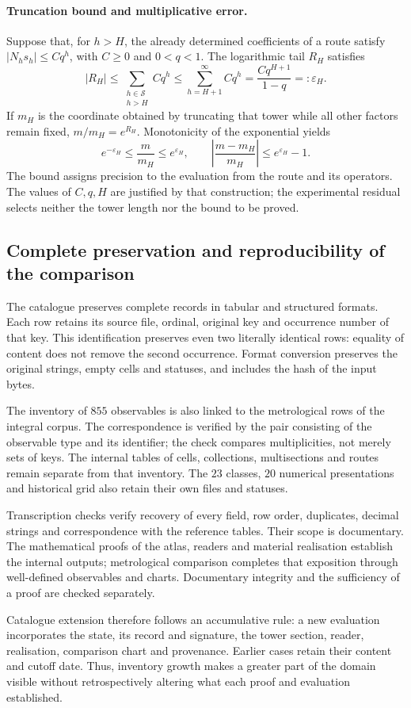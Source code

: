 \paragraph{Truncation bound and multiplicative error.}
Suppose that, for \(h>H\), the already determined coefficients of a
route satisfy \(|N_hs_h|\leq Cq^h\), with \(C\geq0\) and
\(0<q<1\). The logarithmic tail \(R_H\) satisfies
\[
 |R_H|\leq\sum_{\substack{h\in\mathcal S\\h>H}}Cq^h
 \leq\sum_{h=H+1}^{\infty}Cq^h
 =\frac{Cq^{H+1}}{1-q}=:\varepsilon_H.
\]
If \(m_H\) is the coordinate obtained by truncating that tower while all other
factors remain fixed, \(m/m_H=e^{R_H}\). Monotonicity of the
exponential yields
\[
 e^{-\varepsilon_H}\leq\frac{m}{m_H}\leq e^{\varepsilon_H},
 \qquad
 \left|\frac{m-m_H}{m_H}\right|\leq e^{\varepsilon_H}-1.
\]
The bound assigns precision to the evaluation from the route and its
operators. The values of \(C,q,H\) are justified by that
construction; the experimental residual selects neither the tower
length nor the bound to be proved.

\subsection{Complete preservation and reproducibility of the comparison}
\label{subsec:vi-catalogo-reproducible}

The catalogue preserves complete records in tabular and
structured formats. Each row retains its source file, ordinal,
original key and occurrence number of that key. This
identification preserves even two literally identical rows:
equality of content does not remove the second occurrence. Format
conversion preserves the original strings, empty cells and
statuses, and includes the hash of the input bytes.

The inventory of \(855\) observables is also linked to the metrological
rows of the integral corpus. The correspondence is verified
by the pair consisting of the observable type and its identifier;
the check compares multiplicities, not merely sets of keys. The internal
tables of cells, collections, multisections and routes remain separate
from that inventory. The \(23\) classes, \(20\) numerical
presentations and historical grid also retain their own files
and statuses.

Transcription checks verify recovery of every
field, row order, duplicates, decimal strings and
correspondence with the reference tables. Their scope is documentary.
The mathematical proofs of the atlas, readers and material realisation
establish the internal outputs; metrological comparison
completes that exposition through well-defined observables and charts.
Documentary integrity and the sufficiency of a proof are
checked separately.

Catalogue extension therefore follows an accumulative rule:
a new evaluation incorporates the state, its record and signature, the tower
section, reader, realisation, comparison chart and
provenance. Earlier cases retain their content and cutoff
date. Thus, inventory growth makes a greater part of the
domain visible without retrospectively altering what each proof and
evaluation established.
